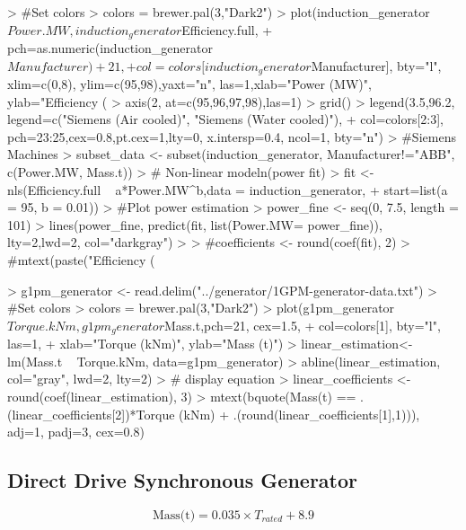 \documentclass{article}
\begin{document}
\begin{Schunk}
\begin{Sinput}
> #Set colors
> colors = brewer.pal(3,"Dark2")
> plot(induction_generator$Power.MW, induction_generator$Efficiency.full, 
+      pch=as.numeric(induction_generator$Manufacturer)+21, 
+      col=colors[induction_generator$Manufacturer], bty="l", xlim=c(0,8), ylim=c(95,98),yaxt="n", las=1,xlab="Power (MW)", ylab="Efficiency (%)")
> axis(2, at=c(95,96,97,98),las=1)
> grid()
> legend(3.5,96.2, legend=c("Siemens (Air cooled)", "Siemens (Water cooled)"), 
+        col=colors[2:3], pch=23:25,cex=0.8,pt.cex=1,lty=0, x.intersp=0.4, ncol=1, bty="n")
> #Siemens Machines
> subset_data <- subset(induction_generator, Manufacturer!="ABB", c(Power.MW, Mass.t))
> # Non-linear modeln(power fit)
> fit <- nls(Efficiency.full ~ a*Power.MW^b,data = induction_generator, 
+          start=list(a = 95, b = 0.01))
> #Plot power estimation
> power_fine <- seq(0, 7.5, length = 101)
> lines(power_fine, predict(fit, list(Power.MW= power_fine)), lty=2,lwd=2, col="darkgray")
> 
> #coefficients <- round(coef(fit), 2) 
> #mtext(paste("Efficiency (%)=",coefficients[1],"xPower(MW)^",coefficients[2], sep=""), 3,-3.5)
\end{Sinput}
\end{Schunk}


\begin{Schunk}
\begin{Sinput}
> g1pm_generator <- read.delim("../generator/1GPM-generator-data.txt")
> #Set colors
> colors = brewer.pal(3,"Dark2")
> plot(g1pm_generator$Torque.kNm, g1pm_generator$Mass.t,pch=21, cex=1.5, 
+      col=colors[1], bty="l", las=1,
+      xlab="Torque (kNm)", ylab="Mass (t)")
> linear_estimation<-lm(Mass.t ~ Torque.kNm, data=g1pm_generator)
> abline(linear_estimation, col="gray", lwd=2, lty=2)
> # display equation
> linear_coefficients <- round(coef(linear_estimation), 3) 
> mtext(bquote(Mass(t) == .(linear_coefficients[2])*Torque (kNm) + .(round(linear_coefficients[1],1))), adj=1, padj=3, cex=0.8)
\end{Sinput}
\end{Schunk}


\subsection{Direct Drive Synchronous Generator}

\begin{equation}
  \text{Mass(t)} = 0.035 \times {T_{rated}} + 8.9
\end{equation}
\end{document}
